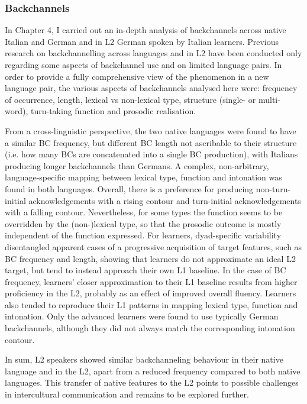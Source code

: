 \subsubsection{Backchannels}
\hypertarget{Toc191305964}{}\begin{stylecaption}
\textup{In Chapter 4, I carried out an in-depth analysis of backchannels across native Italian and German and in L2 German spoken by Italian learners. Previous research on backchannelling across languages and in L2 have been conducted only regarding some aspects of backchannel use and on limited language pairs. In order to provide a fully comprehensive view of the phenomenon in a new language pair, the various aspects of backchannels analysed here were: frequency of occurrence, length, lexical vs non-lexical type, structure (single- or multi-word), turn-taking function and prosodic realisation.}
\end{stylecaption}

\begin{stylecaption}
\textup{From a cross-linguistic perspective, the two native languages were found to have a similar BC frequency, but different BC length not ascribable to their structure (i.e. how many BCs are concatenated into a single BC production), with Italians producing longer backchannels than Germans. A complex, non-arbitrary, language-specific mapping between lexical type, function and intonation was found in both languages. Overall, there is a preference for producing non-turn-initial acknowledgements with a rising contour and turn-initial acknowledgements with a falling contour. Nevertheless, for some types the function seems to be overridden by the (non-)lexical type, so that the prosodic outcome is mostly independent of the function expressed. For learners, dyad-specific variability disentangled apparent cases of a progressive acquisition of target features, such as BC frequency and length, showing that learners do not approximate an ideal L2 target, but tend to instead approach their own L1 baseline. In the case of BC frequency, learners’ closer approximation to their L1 baseline results from higher proficiency in the L2, probably as an effect of improved overall fluency. Learners also tended to reproduce their L1 patterns in mapping lexical type, function and intonation. Only the advanced learners were found to use typically German backchannels, although they did not always match the corresponding intonation contour. }
\end{stylecaption}

\begin{stylecaption}
\textup{In sum, L2 speakers showed similar backchanneling behaviour in their native language and in the L2, apart from a reduced frequency compared to both native languages. This transfer of native features to the L2 points to possible challenges in intercultural communication and remains to be explored further.}
\end{stylecaption}

